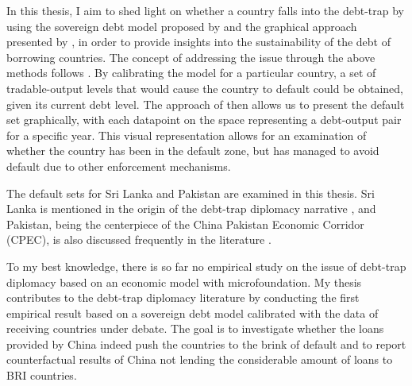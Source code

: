 In this thesis, I aim to shed light on whether a country falls into the debt-trap by using the sovereign debt model proposed by \citet{Na-18} and the graphical approach presented by \citet{Hinrichsen_2020-chapter4}, in order to provide insights into the sustainability of the debt of borrowing countries.
The concept of addressing the issue through the above methods follows \citet{Ho-23-debt-trap}.
By calibrating the model for a particular country, a set of tradable-output levels that would cause the country to default could be obtained, given its current debt level. The approach of \citet{Hinrichsen_2020-chapter4} then allows us to present the default set graphically, with each datapoint on the space representing a debt-output pair for a specific year. This visual representation allows for an examination of whether the country has been in the default zone, but has managed to avoid default due to other enforcement mechanisms.

The default sets for Sri Lanka and Pakistan are examined in this thesis. Sri Lanka is mentioned in the origin of the debt-trap diplomacy narrative \citep{Chellaney_2017}, and Pakistan, being the centerpiece of the China Pakistan Economic Corridor (CPEC), is also discussed frequently in the literature \citep{Hurley19-8-debt-trap}.

To my best knowledge, there is so far no empirical study on the issue of debt-trap diplomacy based on an economic model with microfoundation. My thesis contributes to the debt-trap diplomacy literature by conducting the first empirical result based on a sovereign debt model calibrated with the data of receiving countries under debate. The goal is to investigate whether the loans provided by China indeed push the countries to the brink of default and to report counterfactual results of China not lending the considerable amount of loans to BRI countries.

